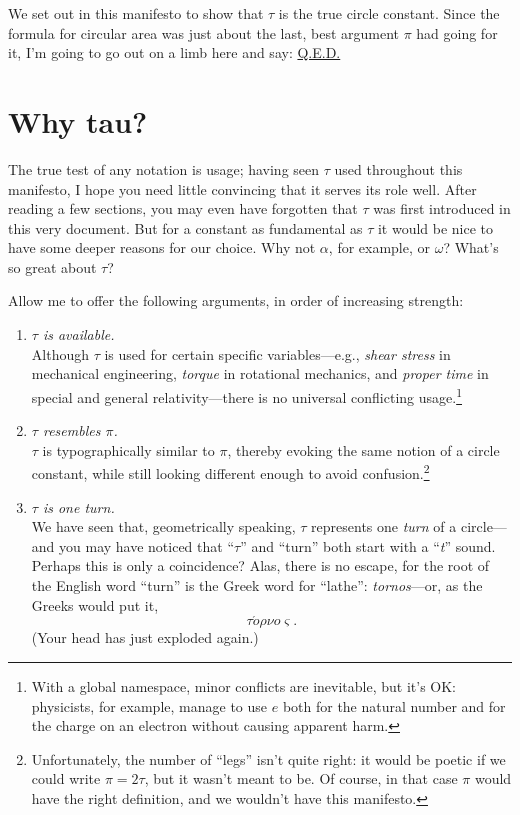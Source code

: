 \documentclass{article}
\begin{document}

We set out in this manifesto to show that $\tau$ is the true circle constant. Since the formula for circular area was just about the last, best argument $\pi$ had going for it, I'm going to go out on a limb here and say: \href{http://en.wikipedia.org/wiki/Q.E.D.}{Q.E.D.}


\section{Why tau?} %
\label{sec:why_tau}

The true test of any notation is usage; having seen $\tau$ used throughout this manifesto, I hope you need little convincing that it serves its role well. After reading a few sections, you may even have forgotten that $\tau$ was first introduced in this very document. But for a constant as fundamental as $\tau$ it would be nice to have some deeper reasons for our choice. Why not $\alpha$, for example, or $\omega$? What's so great about $\tau$?

Allow me to offer the following arguments, in order of increasing strength:

\begin{enumerate}
  \item \emph{$\tau$ is available.} \\ Although $\tau$ is used for certain specific variables---e.g., \emph{shear stress} in mechanical engineering, \emph{torque} in rotational mechanics, and \emph{proper time} in special and general relativity---there is no universal conflicting usage.\footnote{With a global namespace, minor conflicts are inevitable, but it's OK: physicists, for example, manage to use $e$ both for the natural number and for the charge on an electron without causing apparent harm.} 
  
  \item \emph{$\tau$ resembles $\pi$.} \\ $\tau$ is typographically similar to $\pi$, thereby evoking the same notion of a circle constant, while still looking different enough to avoid confusion.\footnote{Unfortunately, the number of ``legs'' isn't quite right: it would be poetic if we could write $\pi = 2\tau$, but it wasn't meant to be. Of course, in that case $\pi$ would have the right definition, and we wouldn't have this manifesto.}
  
  \item \emph{$\tau$ is one turn.} \\ We have seen that, geometrically speaking, $\tau$ represents one \emph{turn} of a circle---and you may have noticed that ``$\tau$'' and ``turn'' both start with a ``\emph{t}'' sound. Perhaps this is only a coincidence? Alas, there is no escape, for the root of the English word ``turn'' is the Greek word for ``lathe'': \emph{tornos}---or, as the Greeks would put it, \[ \tau \acute{o}\rho\nu o\varsigma. \] (Your head has just exploded again.)
\end{enumerate}
\end{document}
